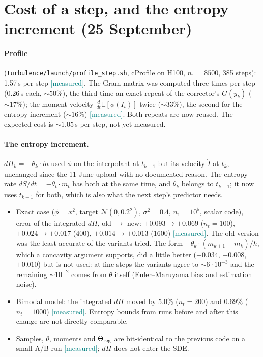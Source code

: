 \documentclass[11pt,a4paper]{article}
\newcommand{\code}[1]{\texttt{#1}}
\newcommand{\meas}{\textcolor{teal}{\textsf{[measured]}}}
\begin{document}
\section{Cost of a step, and the entropy increment (25 September)}\label{sec:cost}
\paragraph{Profile} (\code{turbulence/launch/profile\_step.sh}, cProfile on H100, $n_1=8500$, 385 steps):
1.57\,s per step \meas. The Gram matrix was computed three times per step (0.26\,s each, $\sim50\%$),
the third time an exact repeat of the corrector's $G(y_k)$ ($\sim17\%$); the moment velocity
$\frac{d}{dt}\mathbb E[\phi(I_t)]$ twice ($\sim33\%$), the second for the entropy increment ($\sim16\%$) \meas.
Both repeats are now reused. The expected cost is $\sim1.05$\,s per step, not yet measured.

\paragraph{The entropy increment.} $dH_k=-\theta_k\cdot\dot m$ used $\phi$ on the interpolant at $t_{k+1}$
but its velocity $\dot I$ at $t_k$, unchanged since the 11 June upload with no documented reason. The
entropy rate $dS/dt=-\theta_t\cdot\dot m_t$ has both at the same time, and $\theta_k$ belongs to $t_{k+1}$;
it now uses $t_{k+1}$ for both, which is also what the next step's predictor needs.
\begin{itemize}
  \item Exact case ($\phi=x^2$, target $\mathcal N(0,0.2^2)$, $\sigma^2=0.4$, $n_1=10^5$, scalar code),
        error of the integrated $dH$, old $\to$ new: $+0.093\to+0.069$ ($n_t=100$),
        $+0.024\to+0.017$ (400), $+0.014\to+0.013$ (1600) \meas. The old version was the least accurate
        of the variants tried. The form $-\theta_k\cdot(m_{k+1}-m_k)/h$, which a concavity argument
        supports, did a little better ($+0.034$, $+0.008$, $+0.010$) but is not used: at fine steps the
        variants agree to $\sim6\cdot10^{-3}$ and the remaining $\sim10^{-2}$ comes from $\theta$ itself
        (Euler--Maruyama bias and estimation noise).
  \item Bimodal model: the integrated $dH$ moved by 5.0\% ($n_t=200$) and 0.69\% ($n_t=1000$) \meas.
        Entropy bounds from runs before and after this change are not directly comparable.
  \item Samples, $\theta$, moments and $\Theta_{\rm reg}$ are bit-identical to the previous code on a
        small A/B run \meas; $dH$ does not enter the SDE.
\end{itemize}
\end{document}
